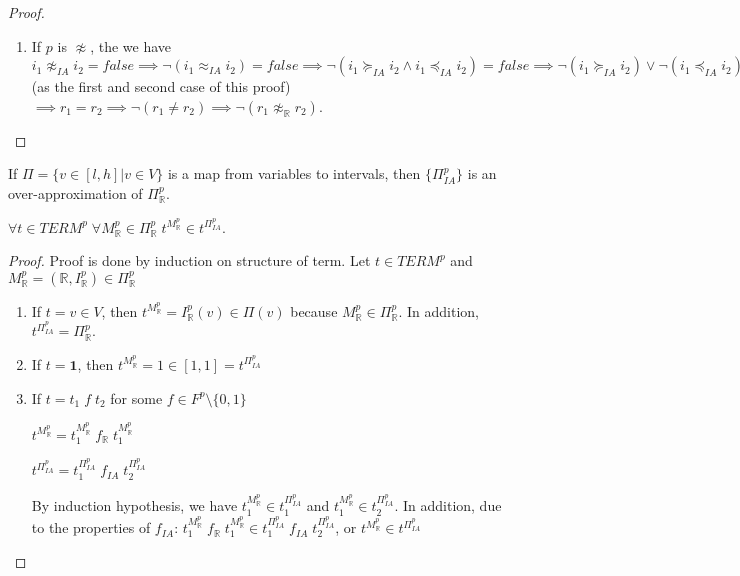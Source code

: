 \begin{proof}
\begin{enumerate}
\item If $p$ is $\not\approx$, the we have $i_1 \not\approx_{IA} i_2 = false \implies \neg(i_1 \approx_{IA} i_2) = false \implies \neg(i_1 \succeq_{IA} i_2 \wedge i_1 \preceq_{IA} i_2) = false \implies \neg(i_1 \succeq_{IA} i_2) \vee \neg(i_1 \preceq_{IA} i_2) = false \implies i_1 \prec_{IA} i_2 \vee i_1 \succ_{IA} i_2 = false \implies i_1 \prec_{IA} i_2 = false \text{ and } i_1 \succ_{IA} i_2 = false \implies r_1 \ge r_2 \text{ and } r_1 \le r_2$ (as the first and second case of this proof) $\implies r_1 = r_2 \implies \neg(r_1 \not= r_2) \implies \neg(r_1 \not\approx_\mathbb{R} r_2)$.
\end{enumerate}
\end{proof}

\begin{theorem} \label{theorem:IA-OverAprox}
If $\Pi = \{v \in [l, h] | v \in V\}$ is a map from variables to intervals, then $\{\Pi^p_{IA}\}$ is an over-approximation of $\Pi^p_\mathbb{R}$.
\end{theorem}

\begin{lemma} \label{lemma:IA-OT}
$\forall t \in TERM^p \; \forall M^p_\mathbb{R} \in \Pi^p_\mathbb{R} \; t^{M^p_\mathbb{R}} \in t^{\Pi^p_{IA}}$.
\end{lemma}

\begin{proof}
Proof is done by induction on structure of term.
Let $t \in TERM^p$ and $M^p_\mathbb{R} = (\mathbb{R}, I^p_\mathbb{R}) \in \Pi^p_\mathbb{R}$
\begin{enumerate}
\item If $t = v \in V$, then $t^{M^p_\mathbb{R}} = I^p_\mathbb{R}(v) \in \Pi(v)$ because $M^p_\mathbb{R} \in \Pi^p_\mathbb{R}$. In addition, $t^{\Pi^p_{IA}} = \Pi^p_\mathbb{R}$.
\item If $t = \mathbf{1}$, then $t^{M^p_\mathbb{R}} = 1 \in [1, 1] = t^{\Pi^p_{IA}}$
\item If $t = t_1 \; f \; t_2$ for some $f \in F^p \setminus \{0, 1\}$

$t^{M^p_\mathbb{R}} = t_1^{M^p_\mathbb{R}} \; f_\mathbb{R} \; t_1^{M^p_\mathbb{R}}$

$t^{\Pi^p_{IA}} = t_1^{\Pi^p_{IA}} \; f_{IA} \; t_2^{\Pi^p_{IA}}$

By induction hypothesis, we have $t_1^{M^p_\mathbb{R}} \in t_1^{\Pi^p_{IA}}$ and $t_1^{M^p_\mathbb{R}} \in t_2^{\Pi^p_{IA}}$. In addition, due to the properties of $f_{IA}$: $t_1^{M^p_\mathbb{R}} \; f_\mathbb{R} \; t_1^{M^p_\mathbb{R}} \in t_1^{\Pi^p_{IA}} \; f_{IA} \; t_2^{\Pi^p_{IA}}$, or $t^{M^p_\mathbb{R}} \in t^{\Pi^p_{IA}}$ 
\end{enumerate}
\end{proof}

